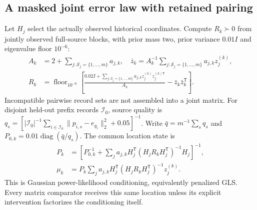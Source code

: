 \documentclass[10pt]{article}
\DeclareMathOperator{\diag}{diag}
\begin{document}
\subsection{A masked joint error law with retained pairing}
Let $H_j$ select the actually observed historical coordinates. Compute
$R_k\succ0$ from jointly observed full-source blocks, with prior mass
two, prior variance $0.01I$ and eigenvalue floor $10^{-6}$:
\begin{equation}
\begin{aligned}
 A_k&=2+\sum_{j:\mathcal S_j=\{1,\ldots,m\}}a_{j,k},\quad
 \bar z_k=A_k^{-1}\sum_{j:\mathcal S_j=\{1,\ldots,m\}}a_{j,k}z_j^{(k)},\\
 R_k&=\operatorname{floor}_{10^{-6}}\left[
 \frac{0.02I+\sum_{j:\mathcal S_j=\{1,\ldots,m\}}
 a_{j,k}z_j^{(k)}z_j^{(k)\mathsf T}}{A_k}
 -\bar z_k\bar z_k^{\mathsf T}\right].
\end{aligned}
\label{eq:predictive-joint-noise}
\end{equation}
Incompatible pairwise record sets are not assembled into a joint matrix.
For disjoint held-out prefix records $\mathcal I_0$, source quality is
$q_s=[|\mathcal I_0|^{-1}\sum_{i\in\mathcal I_0}
\|p_{i,s}-e_{y_i}\|_2^2+0.05]^{-1}$. Write $\bar q=m^{-1}\sum_sq_s$
and $P_{0,k}=0.01\diag(\bar q/q_s)$. The common location state is
\begin{equation}
\begin{aligned}
 P_k&=\left[P_{0,k}^{-1}+\sum_j a_{j,k}H_j^{\mathsf T}
 (H_jR_kH_j^{\mathsf T})^{-1}H_j\right]^{-1},\\
 \mu_k&=P_k\sum_j a_{j,k}H_j^{\mathsf T}
 (H_jR_kH_j^{\mathsf T})^{-1}z_j^{(k)}.
\end{aligned}
\label{eq:masked-precision-posterior}
\end{equation}
This is Gaussian power-likelihood conditioning, equivalently penalized
GLS. Every matrix comparator receives this same location unless its
explicit intervention factorizes the conditioning itself.
\end{document}
